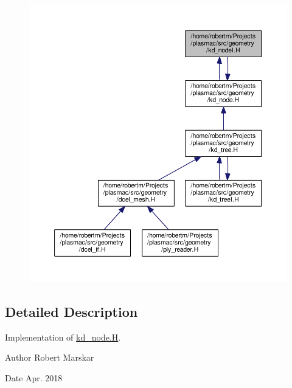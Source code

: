 \begin{figure}[H]
\begin{center}
\leavevmode
\includegraphics[width=350pt]{kd__nodeI_8H__dep__incl}
\end{center}
\end{figure}


\subsection{Detailed Description}
Implementation of \hyperlink{kd__node_8H}{kd\+\_\+node.\+H}. 

\begin{DoxyAuthor}{Author}
Robert Marskar 
\end{DoxyAuthor}
\begin{DoxyDate}{Date}
Apr. 2018 
\end{DoxyDate}
